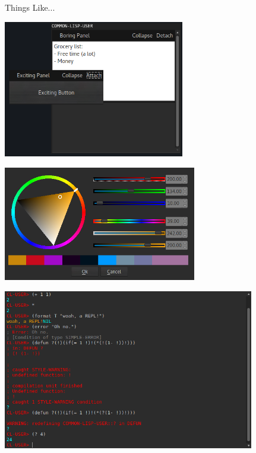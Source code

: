 \documentclass[14pt]{beamer}
\newcommand{\toptitle}[1]{
  {\huge #1} \\
  \vspace{0.2cm}
}
\begin{document}
\begin{frame}
  \toptitle{Things Like...}
  \begin{center}\includegraphics[height=6cm]{panels.png}\end{center}
\end{frame}

\begin{frame}
  \begin{center}\includegraphics[height=5cm]{colors.png}\end{center}
\end{frame}

\begin{frame}
  \begin{center}\includegraphics[height=7cm]{repl.png}\end{center}
\end{frame}
\end{document}
